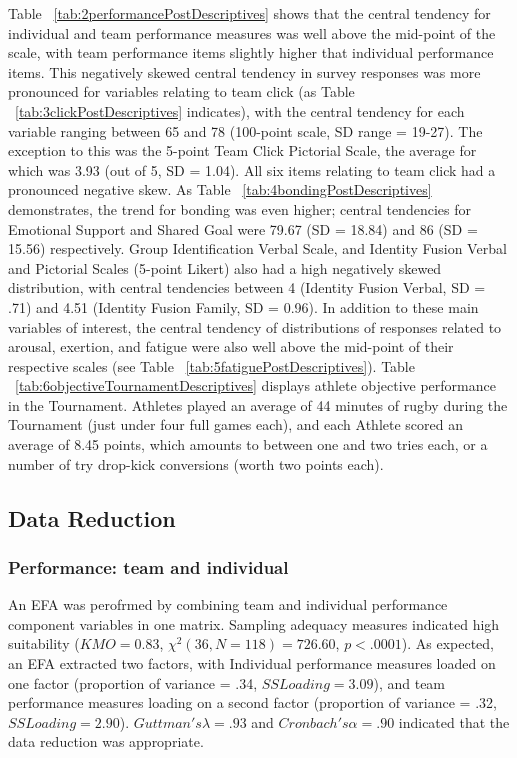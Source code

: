 Table ~\ref{tab:2performancePostDescriptives} shows that the central tendency for individual and team performance measures was well above the mid-point of the scale, with team performance items slightly higher that individual performance items.  This negatively skewed central tendency in survey responses was more pronounced for variables relating to team click (as Table ~\ref{tab:3clickPostDescriptives} indicates), with the central tendency for each variable ranging between 65 and 78 (100-point scale, SD range = 19-27). The exception to this was the 5-point Team Click Pictorial Scale, the average for which was 3.93 (out of 5, SD = 1.04).  All six items relating to team click had a pronounced negative skew.  As Table ~\ref{tab:4bondingPostDescriptives} demonstrates, the trend for bonding was even higher; central tendencies for Emotional Support and Shared Goal were 79.67 (SD = 18.84) and 86 (SD = 15.56) respectively.  Group Identification Verbal Scale, and Identity Fusion Verbal and Pictorial Scales (5-point Likert) also had a high negatively skewed distribution, with central tendencies between 4 (Identity Fusion Verbal, SD = .71) and 4.51 (Identity Fusion Family, SD = 0.96).
In addition to these main variables of interest, the central tendency of distributions of responses related to arousal, exertion, and fatigue were also well above the mid-point of their respective scales (see Table ~\ref{tab:5fatiguePostDescriptives}).  Table ~\ref{tab:6objectiveTournamentDescriptives} displays athlete objective performance in the Tournament. Athletes played an average of 44 minutes of rugby during the Tournament (just under four full games each), and each Athlete scored an average of 8.45 points, which amounts to between one and two tries each, or a number of try drop-kick conversions (worth two points each).








\subsection{Data Reduction}


\subsubsection{Performance: team and individual\label{app8:performanceDataReduction}}

An EFA was perofrmed by combining team and individual performance component variables in one matrix.  Sampling adequacy measures indicated high suitability ($KMO = 0.83$, $\chi^2(36, N = 118) = 726.60$, $p < .0001$).  As expected, an EFA extracted two factors, with Individual performance measures loaded on one factor (proportion of variance = .34, $SS Loading = 3.09$), and team performance measures loading on a second factor (proportion of variance = .32, $SS Loading = 2.90$). $Guttman's \lambda =.93$ and $Cronbach's \alpha = .90$ indicated that the data reduction was appropriate.


